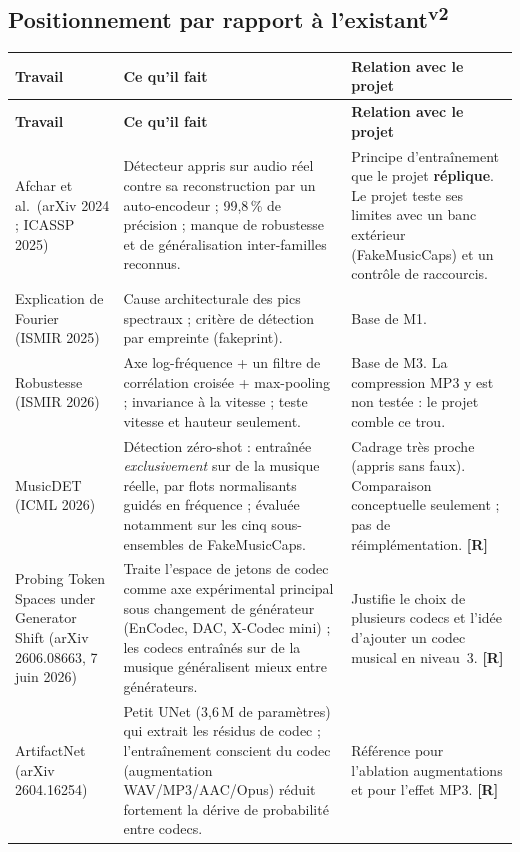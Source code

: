 \documentclass[11pt,a4paper]{article}
\providecommand{\og}{\guillemotleft\nobreakspace}%
\providecommand{\fg}{\nobreakspace\guillemotright}}
\newcommand{\vtwo}{\textsuperscript{\textcolor{orange!80!black}{\textbf{v2}}}}
\newcommand{\lR}{\textbf{\textcolor{orange!80!black}{[R]}}}
\begin{document}
\subsection{Positionnement par rapport à l'existant\vtwo}\label{sec:position}

{\footnotesize
\begin{longtable}{L{3.3cm}L{7.2cm}L{5.0cm}}
\toprule
\textbf{Travail} & \textbf{Ce qu'il fait} & \textbf{Relation avec le projet}\\
\midrule
\endfirsthead
\toprule
\textbf{Travail} & \textbf{Ce qu'il fait} & \textbf{Relation avec le projet}\\
\midrule
\endhead
\bottomrule
\endfoot
Afchar et al.\ (arXiv 2024 ; ICASSP 2025) &
Détecteur appris sur \og{}audio réel contre sa reconstruction par un auto-encodeur\fg{} ; 99,8\,\% de précision ; manque de robustesse et de généralisation inter-familles reconnus. &
Principe d'entraînement que le projet \textbf{réplique}. Le projet teste ses limites avec un banc extérieur (FakeMusicCaps) et un contrôle de raccourcis.\\
\addlinespace
Explication de Fourier (ISMIR 2025) &
Cause architecturale des pics spectraux ; critère de détection par empreinte (fakeprint). &
Base de M1.\\
\addlinespace
Robustesse (ISMIR 2026) &
Axe log-fréquence + un filtre de corrélation croisée + max-pooling ; invariance à la vitesse ; teste vitesse et hauteur seulement. &
Base de M3. La compression MP3 y est non testée : le projet comble ce trou.\\
\addlinespace
MusicDET (ICML 2026) &
Détection \og{}zéro-shot\fg{} : entraînée \emph{exclusivement} sur de la musique réelle, par flots normalisants guidés en fréquence ; évaluée notamment sur les cinq sous-ensembles de FakeMusicCaps. &
Cadrage très proche (\og{}appris sans faux\fg{}). Comparaison conceptuelle seulement ; pas de réimplémentation. \lR\\
\addlinespace
\og{}Probing Token Spaces under Generator Shift\fg{} (arXiv 2606.08663, 7 juin 2026) &
Traite l'espace de jetons de codec comme axe expérimental principal sous changement de générateur (EnCodec, DAC, X-Codec mini) ; les codecs entraînés sur de la musique généralisent mieux entre générateurs. &
Justifie le choix de plusieurs codecs et l'idée d'ajouter un codec musical en niveau~3. \lR\\
\addlinespace
ArtifactNet (arXiv 2604.16254) &
Petit UNet (3,6\,M de paramètres) qui extrait les résidus de codec ; l'entraînement conscient du codec (augmentation WAV/MP3/AAC/Opus) réduit fortement la dérive de probabilité entre codecs. &
Référence pour l'ablation \og{}augmentations\fg{} et pour l'effet MP3. \lR\\
\end{longtable}}
\end{document}

